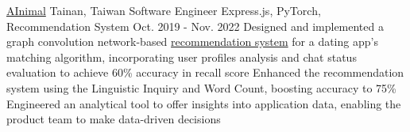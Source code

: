 \resumeExpEntry
{\href{https://ainimal.io}{AInimal}}
{Tainan, Taiwan}
{Software Engineer}
{Express.js, PyTorch, Recommendation System}
{Oct. 2019 - Nov. 2022}
{
  \resumeItemListStart
    \resumeItem
    {Designed and implemented a graph convolution network-based \href{https://github.com/kuouu/dating-app-recsys}{recommendation system} for a dating app's matching algorithm, incorporating user profiles analysis and chat status evaluation to achieve 60\% accuracy in recall score}
    \resumeItem
    {Enhanced the recommendation system using the Linguistic Inquiry and Word Count, boosting accuracy to 75\%}
    \resumeItem
    {Engineered an analytical tool to offer insights into application data, enabling the product team to make data-driven decisions}
  \resumeItemListEnd
}

